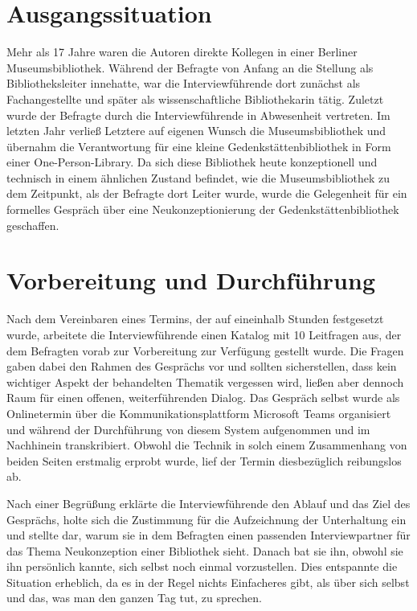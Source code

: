 \documentclass[a4paper,
fontsize=11pt,
oneside,
numbers=noperiodatend,
parskip=half-,
bibliography=totoc,
final
]{scrartcl}
\begin{document}
\section{Ausgangssituation}\label{ausgangssituation}

Mehr als 17 Jahre waren die Autoren direkte Kollegen in einer Berliner
Museumsbibliothek. Während der Befragte von Anfang an die Stellung als
Bibliotheksleiter innehatte, war die Interviewführende dort zunächst als
Fachangestellte und später als wissenschaftliche Bibliothekarin tätig.
Zuletzt wurde der Befragte durch die Interviewführende in Abwesenheit
vertreten. Im letzten Jahr verließ Letztere auf eigenen Wunsch die
Museumsbibliothek und übernahm die Verantwortung für eine kleine
Gedenkstättenbibliothek in Form einer One-Person-Library. Da sich diese
Bibliothek heute konzeptionell und technisch in einem ähnlichen Zustand
befindet, wie die Museumsbibliothek zu dem Zeitpunkt, als der Befragte
dort Leiter wurde, wurde die Gelegenheit für ein formelles Gespräch über
eine Neukonzeptionierung der Gedenkstättenbibliothek geschaffen.

\section{Vorbereitung und
Durchführung}\label{vorbereitung-und-durchfuxfchrung}

Nach dem Vereinbaren eines Termins, der auf eineinhalb Stunden
festgesetzt wurde, arbeitete die Interviewführende einen Katalog mit 10
Leitfragen aus, der dem Befragten vorab zur Vorbereitung zur Verfügung
gestellt wurde. Die Fragen gaben dabei den Rahmen des Gesprächs vor und
sollten sicherstellen, dass kein wichtiger Aspekt der behandelten
Thematik vergessen wird, ließen aber dennoch Raum für einen offenen,
weiterführenden Dialog. Das Gespräch selbst wurde als Onlinetermin über
die Kommunikationsplattform Microsoft Teams organisiert und während der
Durchführung von diesem System aufgenommen und im Nachhinein
transkribiert. Obwohl die Technik in solch einem Zusammenhang von beiden
Seiten erstmalig erprobt wurde, lief der Termin diesbezüglich
reibungslos ab.

Nach einer Begrüßung erklärte die Interviewführende den Ablauf und das
Ziel des Gesprächs, holte sich die Zustimmung für die Aufzeichnung der
Unterhaltung ein und stellte dar, warum sie in dem Befragten einen
passenden Interviewpartner für das Thema Neukonzeption einer Bibliothek
sieht. Danach bat sie ihn, obwohl sie ihn persönlich kannte, sich selbst
noch einmal vorzustellen. Dies entspannte die Situation erheblich, da es
in der Regel nichts Einfacheres gibt, als über sich selbst und das, was
man den ganzen Tag tut, zu sprechen.
\end{document}

